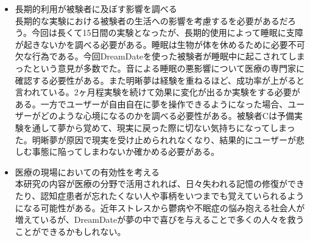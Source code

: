 \begin{itemize}
\item 長期的利用が被験者に及ぼす影響を調べる\\
長期的な実験における被験者の生活への影響を考慮するを必要があるだろう。今回は長くて15日間の実験となったが、長期的使用によって睡眠に支障が起きないかを調べる必要がある。睡眠は生物が体を休めるために必要不可欠な行為である。今回DreamDateを使った被験者が睡眠中に起こされてしまったという意見が多数でた。音による睡眠の悪影響について医療の専門家に確認する必要性がある。また明晰夢は経験を重ねるほど、成功率が上がると言われている\cite{LaBerge}。2ヶ月程実験を続けて効果に変化が出るか実験をする必要がある。一方でユーザーが自由自在に夢を操作できるようになった場合、ユーザーがどのような心境になるのかを調べる必要性がある。被験者Cは予備実験を通して夢から覚めて、現実に戻った際に切ない気持ちになってしまった。明晰夢が原因で現実を受け止められれなくなり、結果的にユーザーが悲しむ事態に陥ってしまわないか確かめる必要がある。\\

\item 医療の現場においての有効性を考える\\
本研究の内容が医療の分野で活用されれば、日々失われる記憶の修復ができたり、認知症患者が忘れたくない人や事柄をいつまでも覚えていられるようになる可能性がある。近年ストレスから鬱病や不眠症の悩み抱える社会人が増えているが、DreamDateが夢の中で喜びを与えることで多くの人々を救うことができるかもしれない。\\
\end{itemize}